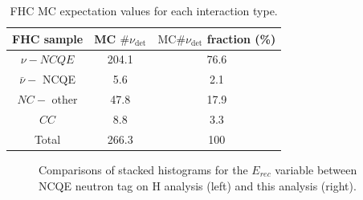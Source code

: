\begin{table}
    \centering
    \begin{tabular}{||ccc||}
        \hline FHC sample & MC $\# \nu_{\mathrm{det}}$ & $\mathrm{MC} \# \nu_{\mathrm{det}}$ fraction (\%) \\
        \hline$\nu-N C Q E$ & 204.1 & 76.6 \\
        $\bar{\nu}-$ NCQE & 5.6 & 2.1 \\
        $N C-$ other & 47.8 & 17.9 \\
        $C C$ & 8.8 & 3.3 \\
        \hline Total & 266.3 & 100 \\
        \hline
        \end{tabular}
    \caption{FHC MC expectation values for each interaction type.}
    \label{table:nu_FHC_mc_chp6}
\end{table}


\begin{figure}[!htbp]
    \centering
    

    
      \hfill 
     \par
    \caption{Comparisons of stacked histograms for the $E_{rec}$ variable between NCQE neutron tag on H analysis (left) and this analysis (right).} \label{fig:erec_reduction} 
        
\end{figure}


